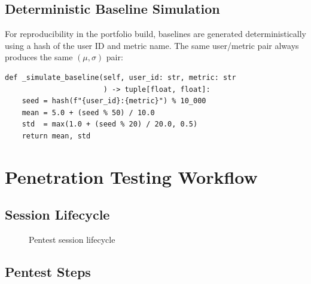 \documentclass[12pt,a4paper]{article}
\begin{document}
\subsection{Deterministic Baseline Simulation}

For reproducibility in the portfolio build, baselines are generated deterministically
using a hash of the user ID and metric name. The same user/metric pair always produces
the same $(\mu, \sigma)$ pair:

\begin{lstlisting}[style=pythonstyle, caption=Deterministic baseline generation]
def _simulate_baseline(self, user_id: str, metric: str
                       ) -> tuple[float, float]:
    seed = hash(f"{user_id}:{metric}") % 10_000
    mean = 5.0 + (seed % 50) / 10.0
    std  = max(1.0 + (seed % 20) / 20.0, 0.5)
    return mean, std
\end{lstlisting}

\section{Penetration Testing Workflow}

\subsection{Session Lifecycle}

\begin{figure}[H]
\centering
{}
\caption{Pentest session lifecycle}
\end{figure}

\subsection{Pentest Steps}
\end{document}
